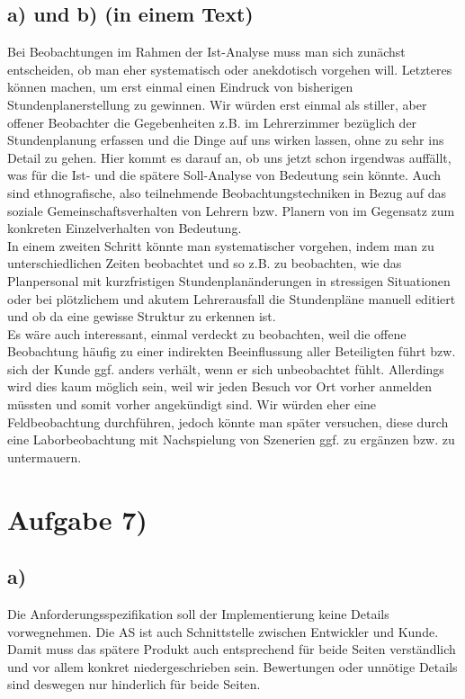 \documentclass{swp1}
\begin{document}
\subsection*{a) und b) (in einem Text)}
Bei Beobachtungen im Rahmen der Ist-Analyse muss man sich zunächst entscheiden, ob man eher systematisch oder anekdotisch vorgehen will. Letzteres können machen, um erst einmal einen Eindruck von bisherigen Stundenplanerstellung zu gewinnen. Wir würden erst einmal als stiller, aber offener Beobachter die Gegebenheiten z.B. im Lehrerzimmer bezüglich der Stundenplanung erfassen und die Dinge auf uns wirken lassen, ohne zu sehr ins Detail zu gehen. Hier kommt es darauf an, ob uns jetzt schon irgendwas auffällt, was für die Ist- und die spätere Soll-Analyse von Bedeutung sein könnte. Auch sind ethnografische, also teilnehmende Beobachtungstechniken in Bezug auf das soziale Gemeinschaftsverhalten von Lehrern bzw. Planern von im Gegensatz zum konkreten Einzelverhalten von Bedeutung.\\
In einem zweiten Schritt könnte man systematischer vorgehen, indem man zu unterschiedlichen Zeiten beobachtet und so z.B. zu beobachten, wie das Planpersonal mit kurzfristigen Stundenplanänderungen in stressigen Situationen oder bei plötzlichem und akutem Lehrerausfall die Stundenpläne manuell editiert und ob da eine gewisse Struktur zu erkennen ist. \\
Es wäre auch interessant, einmal verdeckt zu beobachten, weil die offene Beobachtung häufig zu einer indirekten Beeinflussung aller Beteiligten führt bzw. sich der Kunde ggf. anders verhält, wenn er sich unbeobachtet fühlt. Allerdings wird dies kaum möglich sein, weil wir jeden Besuch vor Ort vorher anmelden müssten und somit vorher angekündigt sind. Wir würden eher eine Feldbeobachtung durchführen, jedoch könnte man später versuchen, diese durch eine Laborbeobachtung mit Nachspielung von Szenerien ggf. zu ergänzen bzw. zu untermauern.

\section*{Aufgabe 7)}
\subsection*{a)}
Die Anforderungsspezifikation soll der Implementierung keine Details vorwegnehmen. Die AS ist auch Schnittstelle zwischen Entwickler und Kunde. Damit muss das spätere Produkt auch entsprechend für beide Seiten verständlich und vor allem konkret niedergeschrieben sein. Bewertungen oder unnötige Details sind deswegen nur hinderlich für beide Seiten.\\
\end{document}
